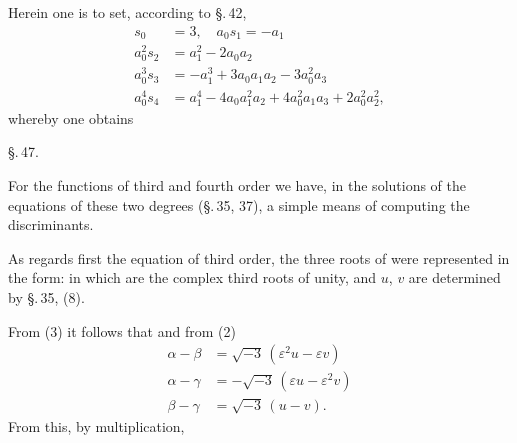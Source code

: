 
Herein one is to set, according to \S.\,42,
\[
\begin{aligned}
s_0 &= 3, \quad a_0 s_1 = -a_1\\
a_0^2 s_2 &= a_1^2 - 2 a_0 a_2\\
a_0^3 s_3 &= -a_1^3 + 3 a_0 a_1 a_2 - 3 a_0^2 a_3\\
a_0^4 s_4 &= a_1^4 - 4 a_0 a_1^2 a_2 + 4 a_0^2 a_1 a_3 + 2 a_0^2 a_2^2,
\end{aligned}
\]
whereby one obtains


\begin{center}
\S.\,47.

\end{center}

For the functions of third and fourth order we have, in the solutions of the equations of these two degrees (\S.\,35, 37), a simple means of computing the discriminants.

As regards first the equation of third order, the three roots of
were represented in the form:
in which
are the complex third roots of unity, and $u$, $v$ are determined by \S.\,35, (8).

From (3) it follows that
and from (2)
\[
\begin{aligned}
\alpha - \beta &= \sqrt{-3}\,(\varepsilon^2 u - \varepsilon v)\\
\alpha - \gamma &= -\sqrt{-3}\,(\varepsilon u - \varepsilon^2 v)\\
\beta - \gamma &= \sqrt{-3}\,(u - v).
\end{aligned}
\]
From this, by multiplication,
